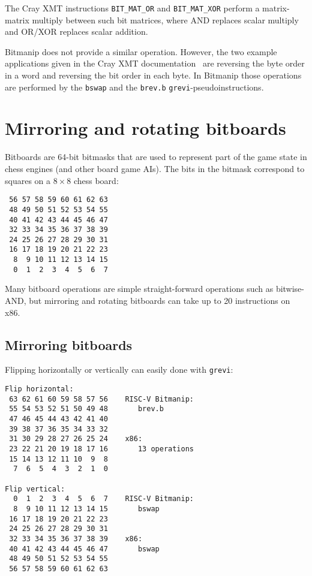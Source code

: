 The Cray XMT instructions {\tt BIT\_MAT\_OR} and {\tt BIT\_MAT\_XOR} perform a
matrix-matrix multiply between such bit matrices, where AND replaces scalar
multiply and OR/XOR replaces scalar addition.

Bitmanip does not provide a similar operation. However, the two example
applications given in the Cray XMT documentation~\cite[p.~81]{CrayXMT}
are reversing the byte order in a word and reversing the bit order in
each byte. In Bitmanip those operations are performed by the {\tt bswap}
and the {\tt brev.b} {\tt grevi}-pseudoinstructions.

\section{Mirroring and rotating bitboards}

Bitboards are 64-bit bitmasks that are used to represent part of the game state
in chess engines (and other board game AIs). The bits in the bitmask correspond
to squares on a $8 \times 8$ chess board:

\begin{verbatim}
 56 57 58 59 60 61 62 63
 48 49 50 51 52 53 54 55
 40 41 42 43 44 45 46 47
 32 33 34 35 36 37 38 39
 24 25 26 27 28 29 30 31
 16 17 18 19 20 21 22 23
  8  9 10 11 12 13 14 15
  0  1  2  3  4  5  6  7
\end{verbatim}

Many bitboard operations are simple straight-forward operations such as
bitwise-AND, but mirroring and rotating bitboards can take up to 20
instructions on x86.

\subsection{Mirroring bitboards}

Flipping horizontally or vertically can easily done with {\tt grevi}:

\begin{verbatim}
Flip horizontal:
 63 62 61 60 59 58 57 56    RISC-V Bitmanip:
 55 54 53 52 51 50 49 48       brev.b
 47 46 45 44 43 42 41 40
 39 38 37 36 35 34 33 32
 31 30 29 28 27 26 25 24    x86:
 23 22 21 20 19 18 17 16       13 operations
 15 14 13 12 11 10  9  8
  7  6  5  4  3  2  1  0

Flip vertical:
  0  1  2  3  4  5  6  7    RISC-V Bitmanip:
  8  9 10 11 12 13 14 15       bswap
 16 17 18 19 20 21 22 23
 24 25 26 27 28 29 30 31
 32 33 34 35 36 37 38 39    x86:
 40 41 42 43 44 45 46 47       bswap
 48 49 50 51 52 53 54 55
 56 57 58 59 60 61 62 63
\end{verbatim}

